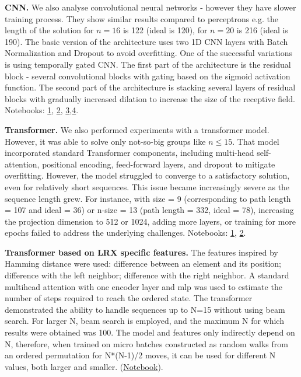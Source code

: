 \documentclass[atmp]{ipart_v1}
\numberwithin{equation}{section}
\theoremstyle{plain}%
\begin{document}
{\bf CNN.}
We also analyse convolutional neural networks - however they have slower training process. They show similar  results compared to perceptrons
e.g. the length of the solution for $n=16$ is 122 (ideal is 120), for $n=20$ is 216 (ideal is 190). The basic version of the architecture uses two 1D CNN layers with Batch Normalization and Dropout to avoid overfitting. One of the successful variations is using temporally gated CNN. The first part of the architecture is the residual block - several convolutional blocks with gating based on the sigmoid activation function. The second part of the architecture is stacking several layers of residual blocks with gradually increased dilation to increase the size of the receptive field.
Notebooks: \href{https://www.kaggle.com/code/artgor/encoding-as-permutation-matrix-1d-cnn}{1}, \href{https://www.kaggle.com/code/artgor/encoding-as-permutation-mat-simple-2d-cnn}{2}, \href{https://colab.research.google.com/drive/1oWuQg33bveHYqVET4IES_EWIH1nsa4yi}{3},\href{https://colab.research.google.com/drive/1oWuQg33bveHYqVET4IES_EWIH1nsa4yi}{4}.

{\bf Transformer.} We also performed experiments with a transformer model. However, it was able to solve only not-so-big groups like $n\le 15$. 
That model incorporated standard Transformer components, including multi-head self-attention, positional encoding, feed-forward layers, and dropout to mitigate overfitting. However, the model struggled to converge to a satisfactory solution, even for relatively short sequences. This issue became increasingly severe as the sequence length grew. For instance, with size = 9 (corresponding to path length = 107 and ideal = 36) or n-size = 13 (path length = 332, ideal = 78), increasing the projection dimension to 512 or 1024, adding more layers, or training for more epochs failed to address the underlying challenges. Notebooks: \href{https://www.kaggle.com/code/nursmen/lrx-transformer-training}{1}, \href{https://www.kaggle.com/code/nursmen/lrx-transformer-use}{2}.


{\bf Transformer based on LRX specific features.}
The features inspired by Hamming distance were used:  difference between an element and its position;  difference with the left neighbor;  difference with the right neighbor. A standard multihead attention with one encoder layer and mlp was used to estimate the number of steps required to reach the ordered state. The transformer demonstrated the ability to handle sequences up to N=15 without using beam search. For larger N, beam search is employed, and the maximum N for which results were obtained was 100. The model and features only indirectly depend on N, therefore, when trained on micro batches constructed as random walks from an ordered permutation for N*(N-1)/2 moves, it can be used for different N values, both larger and smaller.  (\href{https://www.kaggle.com/code/sergeifironov/permutation-transformer-solver-100}{Notebook}). 
\end{document}
